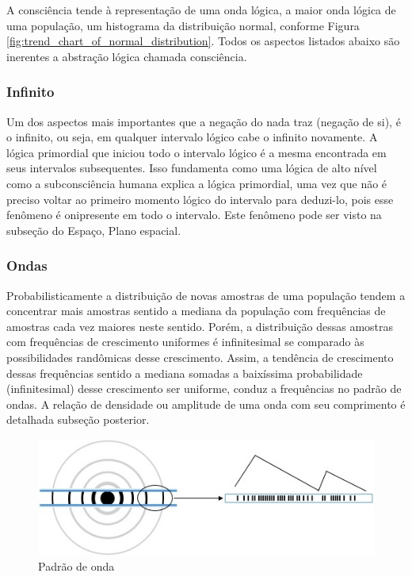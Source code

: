 A consciência tende à representação de uma onda lógica, a maior onda lógica de uma população, um histograma da distribuição normal, conforme Figura \ref{fig:trend_chart_of_normal_distribution}. Todos os aspectos listados abaixo são inerentes a abstração lógica chamada consciência.

\subsubsection{Infinito}
Um dos aspectos mais importantes que a negação do nada traz (negação de si), é o infinito, ou seja, em qualquer intervalo lógico cabe o infinito novamente. A lógica primordial que iniciou todo o intervalo lógico é a mesma encontrada em seus intervalos subsequentes. Isso fundamenta como uma lógica de alto nível como a subconsciência humana explica a lógica primordial, uma vez que não é preciso voltar ao primeiro momento lógico do intervalo para deduzi-lo, pois esse fenômeno é onipresente em todo o intervalo. Este fenômeno pode ser visto na subseção do Espaço, Plano espacial.

\subsubsection{Ondas}
Probabilisticamente a distribuição de novas amostras de uma população tendem a concentrar mais amostras sentido a mediana da população com frequências de amostras cada vez maiores neste sentido. Porém, a distribuição dessas amostras com frequências de crescimento uniformes é infinitesimal se comparado às possibilidades randômicas desse crescimento. Assim, a tendência de crescimento dessas frequências sentido a mediana somadas a baixíssima probabilidade (infinitesimal) desse crescimento ser uniforme, conduz a frequências no padrão de ondas. A relação de densidade ou amplitude de uma onda com seu comprimento é detalhada subseção posterior.
	\begin{figure}[H]
	\caption{Padrão de onda}
	\label{fig:consciousness_waves}
	\centering
	\includegraphics[scale=.8]{sections/images/consciousness_waves.jpg}
	\end{figure}

